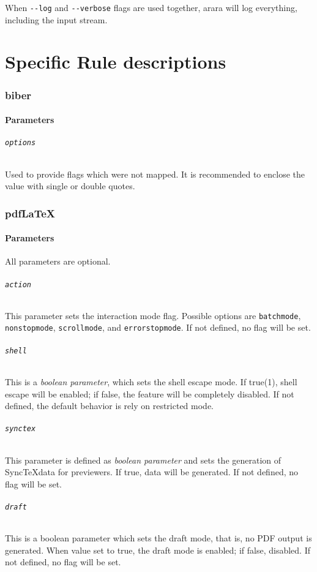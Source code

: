 \documentclass[a4paper]{article}
\begin{document}
When \verb|--log| and \verb|--verbose| flags are used together, arara will log everything, including the input stream.
\part{Specific Rule descriptions}
\section{biber}
\subsection*{Parameters}
\paragraph{\texttt{options}}
Used to provide	flags which were not mapped. It is recommended to enclose the value with single or double quotes.
\section{pdfLaTeX}
\subsection{Parameters}
All parameters are optional.
\paragraph{\texttt{action}}
This parameter sets the interaction mode flag. Possible options are \verb|batchmode|, \verb|nonstopmode|, \verb|scrollmode|, and \verb|errorstopmode|. If not defined, no flag will be set.
\paragraph{\texttt{shell}}
This is a \emph{boolean parameter}, which sets the shell escape mode. If true(1), shell escape will be enabled; if false, the feature will be completely disabled. If not defined, the default behavior is rely on restricted mode.
\paragraph{\texttt{synctex}}
This parameter is defined as \emph{boolean parameter} and sets the generation of Sync\TeX data for previewers. If true, data will be generated. If not defined, no flag will be set.
\paragraph{\texttt{draft}}
This is a boolean parameter which sets the draft mode, that is, no PDF output is generated. When value set to true, the draft mode is enabled; if false, disabled. If not defined, no flag will be set.
\end{document}
